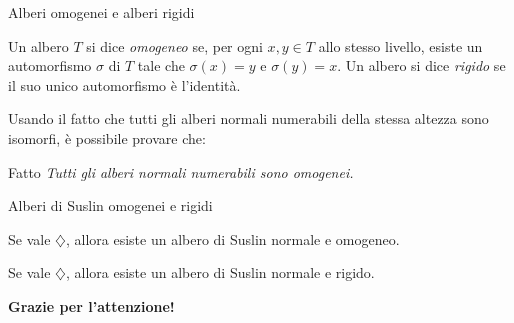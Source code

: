 \documentclass{beamer}
\theoremstyle{num.custom-title}
\theoremstyle{custom-title}
\begin{document}
\begin{frame}{Alberi omogenei e alberi rigidi}

\begin{definition}
Un albero $T$ si dice \emph{omogeneo} se, per ogni $x,y \in T$ allo stesso livello, esiste un automorfismo $\sigma$ di $T$ tale che $\sigma(x)=y$ e $\sigma(y)=x$. Un albero si dice \emph{rigido} se il suo unico automorfismo è l'identità.
\end{definition}

\pause

Usando il fatto che tutti gli alberi normali numerabili della stessa altezza sono isomorfi, è possibile provare che:

\begin{block}{Fatto}
\textit{Tutti gli alberi normali numerabili sono omogenei.}
\end{block}

\end{frame}


\begin{frame}{Alberi di Suslin omogenei e rigidi}

\begin{theorem}[Jensen, 1971]
Se vale $\diamondsuit$, allora esiste un albero di Suslin normale e omogeneo.
\end{theorem}

\pause

\begin{theorem}[Jensen, 1971]
Se vale $\diamondsuit$, allora esiste un albero di Suslin normale e rigido.
\end{theorem}

\end{frame}


\begin{frame}[plain]
\begin{center}
\Large \textbf{Grazie per l'attenzione!}
\end{center}
\end{frame}
\end{document}
